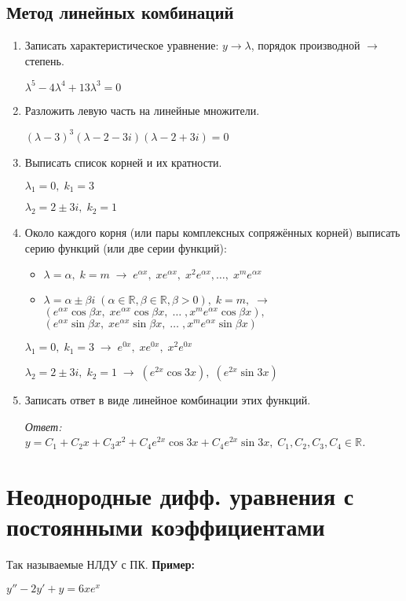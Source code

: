 \documentclass[10pt, a4paper]{article}
\begin{document}
\subsection{Метод линейных комбинаций}
\begin{enumerate}
    \item Записать характеристическое уравнение: $y \rightarrow \lambda$, порядок производной $\rightarrow$ степень.
        \par $\lambda^5 - 4\lambda^4 + 13\lambda^3 = 0$
    \item Разложить левую часть на линейные множители. \par $(\lambda - 3)^3(\lambda - 2 - 3i)(\lambda - 2 + 3i) = 0$
    \item Выписать список корней и их кратности.
        \par $\lambda_1 = 0,\;k_1 = 3$
        \par $\lambda_2 = 2 \pm 3i,\;k_2 = 1$
    \item Около каждого корня (или пары комплексных сопряжённых корней) выписать серию функций (или две серии функций):
    \begin{itemize}
        \item $\lambda = \alpha,\;k = m\;\rightarrow\;e^{\alpha x}, \;
              xe^{\alpha x},\;x^2e^{\alpha x}, \dots,\;x^me^{\alpha x}$
        \item $\lambda = \alpha \pm \beta i\;(\alpha \in \mathbb{R}, \beta \in \mathbb{R}, \beta > 0),\;k = m,\;\rightarrow\;$ \\
              $(e^{\alpha x}\cos{\beta x},\;x e^{\alpha x}\cos{\beta x},\;\dots\;, x^m e^{\alpha x}\cos{\beta x}),$ \\
              $(e^{\alpha x}\sin{\beta x},\;x e^{\alpha x}\sin{\beta x},\;\dots\;, x^m e^{\alpha x}\sin{\beta x})$
    \end{itemize}
        \par $\lambda_1 = 0,\;k_1 = 3\;\rightarrow \;
             e^{0x},\;xe^{0x},\;x^2e^{0x}$
        \par $\lambda_2 = 2 \pm 3i,\;k_2 = 1\;\rightarrow \;
             (e^{2x}\cos{3x}),\;(e^{2x}\sin{3x})$
    \item Записать ответ в виде линейное комбинации этих функций.
        \par\textit{Ответ: $y = C_1 + C_2x + C_3x^2 + C_4e^{2x}\cos{3x} + C_4e^{2x}\sin{3x},\;
                   C_1, C_2, C_3, C_4 \in \mathbb{R}$.}
\end{enumerate}


\section{Неоднородные дифф. уравнения с постоянными коэффициентами}
Так называемые НЛДУ с ПК.
\newline
\textbf{Пример:}
\par $y'' - 2y' + y = 6xe^x$
\end{document}
